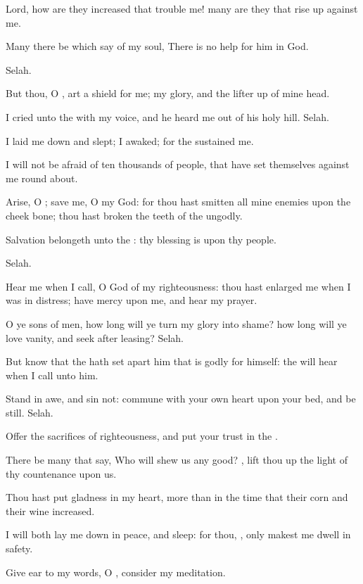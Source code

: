 \Chapter
\Verse Lord, how are they increased that trouble me! many are they that rise up against me.

\Verse Many there be which say of my soul, There is no help for him in God.

Selah.

\Verse But thou, O \LORD, art a shield for me; my glory, and the lifter up of mine head.

\Verse I cried unto the \LORD with my voice, and he heard me out of his holy hill. Selah.

\Verse I laid me down and slept; I awaked; for the \LORD sustained me.

\Verse I will not be afraid of ten thousands of people, that have set themselves against me round about.

\Verse Arise, O \LORD; save me, O my God: for thou hast smitten all mine enemies upon the cheek bone; thou hast broken the teeth of the ungodly.

\Verse Salvation belongeth unto the \LORD: thy blessing is upon thy people.

Selah.




\Chapter
\Verse Hear me when I call, O God of my righteousness: thou hast enlarged me when I was in distress; have mercy upon me, and hear my prayer.

\Verse O ye sons of men, how long will ye turn my glory into shame? how long will ye love vanity, and seek after leasing? Selah.

\Verse But know that the \LORD hath set apart him that is godly for himself: the \LORD will hear when I call unto him.

\Verse Stand in awe, and sin not: commune with your own heart upon your bed, and be still. Selah.

\Verse Offer the sacrifices of righteousness, and put your trust in the \LORD.

\Verse There be many that say, Who will shew us any good? \LORD, lift thou up the light of thy countenance upon us.

\Verse Thou hast put gladness in my heart, more than in the time that their corn and their wine increased.

\Verse I will both lay me down in peace, and sleep: for thou, \LORD, only makest me dwell in safety.




\Chapter
\Verse Give ear to my words, O \LORD, consider my meditation.

